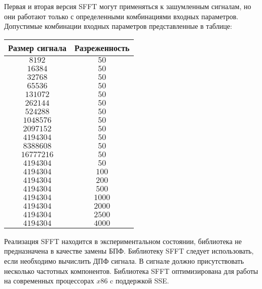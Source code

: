 Первая и вторая версия SFFT могут применяться к зашумленным сигналам, но они работают только с определенными комбинациями входных параметров. Допустимые комбинации входных параметров представленные в таблице:
\begin{table}[ht]
	\caption{Допустимые комбинации входных параметров}%
	\label{tbl:test3_1}%
	\fontsize{14pt}{14pt}\selectfont
	\begin{longtable*}[c]{|c|c|} 
		\hline
		Размер сигнала & Разреженность \\
		\hline
		$8192$ & $50$ \\
		$16384$ & $50$ \\
		$32768$	& $50$ \\
		$65536$	& $50$ \\
		$131072$ & $50$ \\
		$262144$ & $50$ \\
		$524288$ & $50$ \\
		$1048576$ & $50$ \\
		$2097152$ & $50$ \\
		$4194304$ & $50$ \\
		$8388608$ &	$50$ \\
		$16777216$ & $50$ \\
		$4194304$ & $50$ \\
		$4194304$ & $100$ \\
		$4194304$ & $200$ \\
		$4194304$ & $500$ \\
		$4194304$ & $1000$ \\
		$4194304$ & $2000$ \\ 
		$4194304$ & $2500$ \\
		$4194304$ & $4000$ \\
		\hline
	\end{longtable*}
\end{table}

Реализация SFFT находится в экспериментальном состоянии, библиотека не предназначена в качестве замены БПФ. Библиотеку SFFT следует использовать, если необходимо вычислить ДПФ сигнала. В сигнале должно присутствовать  несколько частотных компонентов. Библиотека SFFT оптимизирована для работы на современных процессорах $x86$ c поддержкой SSE.


